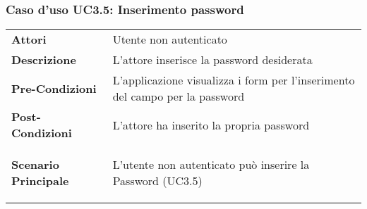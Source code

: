\subsubsection{Caso d'uso UC3.5:  Inserimento password}
\label{UC3_5}

\begin{longtable}{ l | p{11cm}}
	\hline
	\rowcolor{Gray}
	 \multicolumn{2}{c}{UC3.5 - Inserimento password} \\
	 \hline
	\textbf{Attori} & Utente non autenticato \\
	\textbf{Descrizione} & L'attore inserisce la password desiderata  \\
	\textbf{Pre-Condizioni} & L'applicazione visualizza i form per l'inserimento del campo per la password \\
	\textbf{Post-Condizioni} & L'attore ha inserito la propria password \\
	\textbf{Scenario Principale} & \begin{enumerate*}[label=(\arabic*.),itemjoin={\newline}]
		\item L'utente non autenticato può inserire la Password (UC3.5)
	\end{enumerate*}\\
\end{longtable}